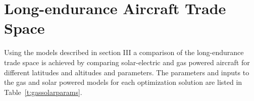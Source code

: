 \documentclass[]{aiaa-tc}%
\begin{document}
%  
% 
% 

\section{Long-endurance Aircraft Trade Space}

Using the models described in section III a comparison of the long-endurance trade space is achieved by comparing solar-electric and gas powered aircraft for different latitudes and altitudes and parameters. 
The parameters and inputs to the gas and solar powered models for each optimization solution are listed in Table~\ref{t:gassolarparams}.  \\
\end{document}
